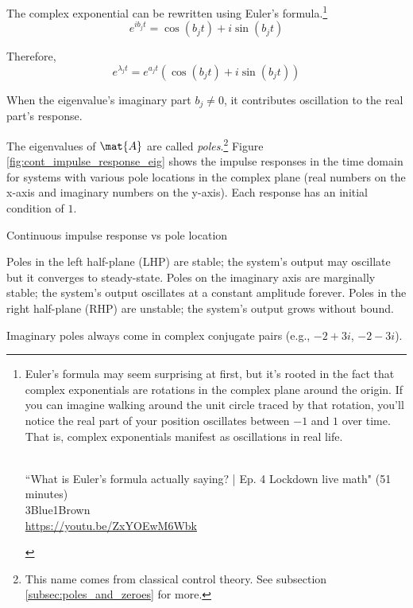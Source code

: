 The complex exponential can be rewritten using Euler's formula.\footnote{Euler's
formula may seem surprising at first, but it's rooted in the fact that complex
exponentials are rotations in the complex plane around the origin. If you can
imagine walking around the unit circle traced by that rotation, you'll notice
the real part of your position oscillates between $-1$ and $1$ over time. That
is, complex exponentials manifest as oscillations in real life.
\begin{center}
   \\
  ``What is Euler's formula actually saying? | Ep. 4 Lockdown live math" (51
    minutes) \\
  \footnotesize 3Blue1Brown \\
  \url{https://youtu.be/ZxYOEwM6Wbk}
\end{center}
}
\begin{equation*}
  e^{i b_j t} = \cos(b_j t) + i \sin(b_j t)
\end{equation*}

Therefore,
\begin{equation*}
  e^{\lambda_j t} = e^{a_j t} (\cos(b_j t) + i \sin(b_j t))
\end{equation*}

When the eigenvalue's imaginary part $b_j \neq 0$, it contributes oscillation to
the real part's response.

The eigenvalues of $\mat{A}$ are called \textit{poles}.\footnote{This name comes
from classical control theory. See subsection \ref{subsec:poles_and_zeroes} for
more.} Figure \ref{fig:cont_impulse_response_eig} shows the \glspl{impulse
response} in the time domain for \glspl{system} with various pole locations in
the complex plane (real numbers on the x-axis and imaginary numbers on the
y-axis). Each response has an initial condition of $1$.
\begin{bookfigure}
  
  \caption{Continuous impulse response vs pole location}
  \label{fig:cont_impulse_response_eig}
\end{bookfigure}

Poles in the left half-plane (LHP) are stable; the \gls{system}'s output may
oscillate but it converges to steady-state. Poles on the imaginary axis are
marginally stable; the \gls{system}'s output oscillates at a constant amplitude
forever. Poles in the right half-plane (RHP) are unstable; the \gls{system}'s
output grows without bound.
\begin{remark}
  Imaginary poles always come in complex conjugate pairs (e.g., $-2 + 3i$,
  $-2 - 3i$).
\end{remark}
